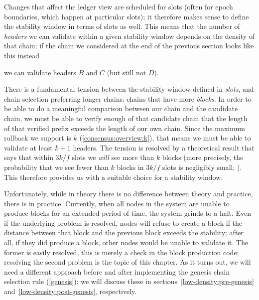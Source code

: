Changes that affect the ledger view are scheduled for slots (often
for epoch boundaries, which happen at particular slots); it therefore makes
sense to define the stability window in terms of slots as well. This means that
the number of \emph{headers} we can validate within a given stability window
depends on the density of that chain; if the chain we considered at the end
of the previous section looks like this instead
%
\begin{center}
\end{center}
%
we can validate headers $B$ and $C$ (but still not $D$).

There is a fundamental tension between the stability window defined in
\emph{slots}, and chain selection preferring  longer chains: chains that have
more \emph{blocks}. In order to be able to do a meaningful comparison between
our chain and the candidate chain, we must be able to verify enough of that
candidate chain that the length of that verified prefix exceeds the length of
our own chain. Since the maximum rollback we support is $k$
(\cref{consensus:overview:k}), that means we must be able to validate at least
$k + 1$ headers. The tension is resolved by a theoretical result that says that
within $3k/f$ slots we \emph{will} see more than $k$ blocks (more precisely, the
probability that we see fewer than $k$ blocks in $3k/f$ slots is negligibly
small; \cite{cryptoeprint:2017:573}). This therefore provides us with a suitable
choice for a stability window.

Unfortunately, while in theory there is no difference between theory and
practice, there is in practice. Currently, when all nodes in the system are
unable to produce blocks for an extended period of time, the system grinds to a
halt. Even if the underlying problem is resolved, nodes will refuse to create a
block if the distance between that block and the previous block exceeds the
stability; after all, if they did produce a block, other nodes would be unable
to validate it. The former is easily resolved, this is merely a check in the
block production code; resolving the second problem is the topic of this
chapter. As it turns out, we will need a different approach before and after
implementing the genesis chain selection rule (\cref{genesis}); we will discuss
these in sections~\ref{low-density:pre-genesis}
and~\ref{low-density:post-genesis}, respectively.

